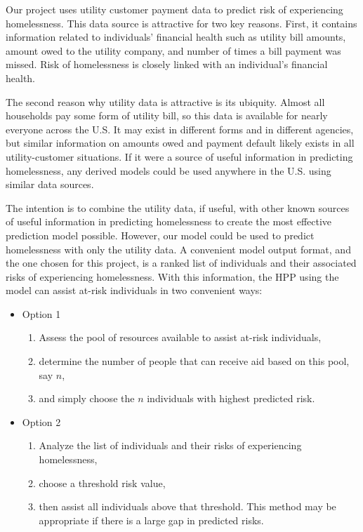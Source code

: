\documentclass[10pt,letterpaper]{article}
\newcommand{\red}[1]{{\color{red}{#1}}}
\begin{document}
Our project uses utility customer payment data to predict risk of experiencing homelessness. This data source is attractive for two key reasons. First, it contains information related to individuals' financial health such as utility bill amounts, amount owed to the utility company, and number of times a bill payment was missed. Risk of homelessness is closely linked with an individual's financial health.

The second reason why utility data is attractive is its ubiquity. Almost all households pay some form of utility bill, so this data is available for nearly everyone across the U.S. It may exist in different forms and in different agencies, but similar information on amounts owed and payment default likely exists in all utility-customer situations. If it were a source of useful information in predicting homelessness, any derived models could be used anywhere in the U.S. using similar data sources. 

The intention is to combine the utility data, if useful, with other known sources of useful information in predicting homelessness to create the most effective prediction model possible. However, our model could be used to predict homelessness with only the utility data. A convenient model output format, and the one chosen for this project, is a ranked list of individuals and their associated risks of experiencing homelessness. With this information, the HPP using the model can assist at-risk individuals in two convenient ways: \red{remove this?}

\begin{itemize}
    \item Option 1
    \begin{enumerate}
        \item Assess the pool of resources available to assist at-risk individuals,
        \item determine the number of people that can receive aid based on this pool, say $n$,
        \item and simply choose the $n$ individuals with highest predicted risk.
    \end{enumerate}
    \item Option 2
    \begin{enumerate}
        \item Analyze the list of individuals and their risks of experiencing homelessness,
        \item choose a threshold risk value,
        \item then assist all individuals above that threshold. This method may be appropriate if there is a large gap in predicted risks.
    \end{enumerate}
\end{itemize}
\end{document}
